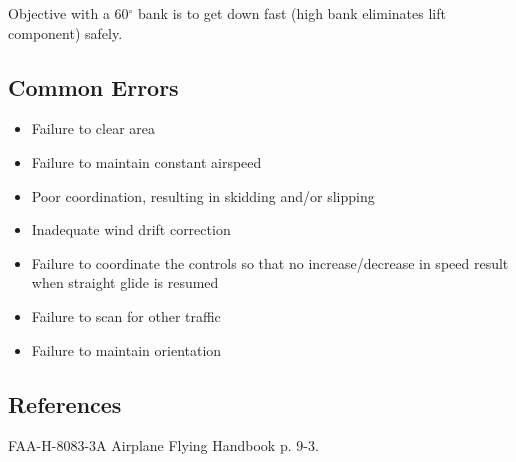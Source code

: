 Objective with a 60$^\circ$ bank is to get down fast (high bank eliminates lift
component) safely.

\subsection{Common Errors}

\begin{itemize}
  \item Failure to clear area
  \item Failure to maintain constant airspeed
  \item Poor coordination, resulting in skidding and/or slipping
  \item Inadequate wind drift correction
  \item Failure to coordinate the controls so that no increase/decrease in
    speed result when straight glide is resumed
  \item Failure to scan for other traffic
  \item Failure to maintain orientation
\end{itemize}

\subsection{References}

FAA-H-8083-3A Airplane Flying Handbook p. 9-3.

